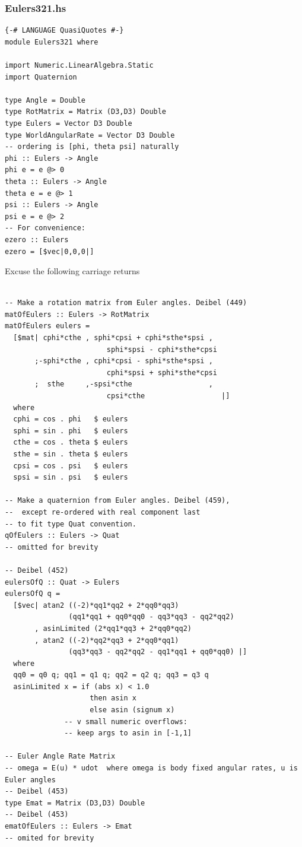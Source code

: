 \documentclass[12pt]{report}
\begin{document}
\subsubsection{Eulers321.hs}
\begin{lstlisting}
{-# LANGUAGE QuasiQuotes #-}
module Eulers321 where

import Numeric.LinearAlgebra.Static
import Quaternion

type Angle = Double
type RotMatrix = Matrix (D3,D3) Double
type Eulers = Vector D3 Double
type WorldAngularRate = Vector D3 Double
-- ordering is [phi, theta psi] naturally
phi :: Eulers -> Angle
phi e = e @> 0
theta :: Eulers -> Angle
theta e = e @> 1
psi :: Eulers -> Angle
psi e = e @> 2
-- For convenience:
ezero :: Eulers
ezero = [$vec|0,0,0|]

\end{lstlisting}
Excuse the following carriage returns
\begin{lstlisting}

-- Make a rotation matrix from Euler angles. Deibel (449)
matOfEulers :: Eulers -> RotMatrix
matOfEulers eulers = 
  [$mat| cphi*cthe , sphi*cpsi + cphi*sthe*spsi ,
                        sphi*spsi - cphi*sthe*cpsi 
       ;-sphi*cthe , cphi*cpsi - sphi*sthe*spsi , 
                        cphi*spsi + sphi*sthe*cpsi
       ;  sthe     ,-spsi*cthe                  , 
                        cpsi*cthe                  |]
  where
  cphi = cos . phi   $ eulers
  sphi = sin . phi   $ eulers
  cthe = cos . theta $ eulers
  sthe = sin . theta $ eulers
  cpsi = cos . psi   $ eulers
  spsi = sin . psi   $ eulers

-- Make a quaternion from Euler angles. Deibel (459),
--  except re-ordered with real component last
-- to fit type Quat convention.
qOfEulers :: Eulers -> Quat
-- omitted for brevity

-- Deibel (452)
eulersOfQ :: Quat -> Eulers
eulersOfQ q =
  [$vec| atan2 ((-2)*qq1*qq2 + 2*qq0*qq3) 
               (qq1*qq1 + qq0*qq0 - qq3*qq3 - qq2*qq2)
       , asinLimited (2*qq1*qq3 + 2*qq0*qq2)
       , atan2 ((-2)*qq2*qq3 + 2*qq0*qq1) 
               (qq3*qq3 - qq2*qq2 - qq1*qq1 + qq0*qq0) |]
  where 
  qq0 = q0 q; qq1 = q1 q; qq2 = q2 q; qq3 = q3 q
  asinLimited x = if (abs x) < 1.0 
                    then asin x 
                    else asin (signum x) 
              -- v small numeric overflows: 
              -- keep args to asin in [-1,1]

-- Euler Angle Rate Matrix
-- omega = E(u) * udot  where omega is body fixed angular rates, u is Euler angles
-- Deibel (453)
type Emat = Matrix (D3,D3) Double
-- Deibel (453)
ematOfEulers :: Eulers -> Emat
-- omited for brevity
\end{lstlisting}
\end{document}
